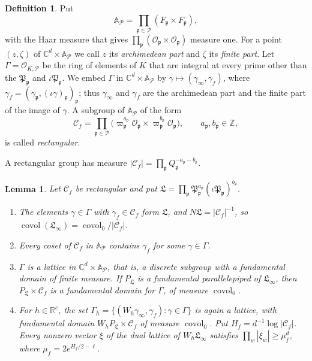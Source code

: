 \documentclass[11pt]{amsart}
\numberwithin{equation}{section}
\newtheorem{lemma}[equation]{Lemma}
\theoremstyle{definition}
\newtheorem{definition}[equation]{Definition}
\theoremstyle{remark}
\DeclareMathOperator{\covol}{covol}
\newcommand{\R}{\mathbb R}
\newcommand{\C}{\mathbb C}
\newcommand{\Z}{\mathbb Z}
\begin{document}
\begin{definition}\label{fw:finite-coordinates}
Put
\[
 \mathbb A_{\mathcal P}=\prod_{\mathfrak p\in\mathcal P}
 (F_{\mathfrak p}\times F_{\mathfrak p}),
\]
with the Haar measure that gives $\prod_{\mathfrak p}(\mathcal
O_{\mathfrak p}\times\mathcal O_{\mathfrak p})$ measure one. For a point
$(z,\zeta)$ of $\C^d\times\mathbb A_{\mathcal P}$ we call $z$ its
\emph{archimedean part} and $\zeta$ its \emph{finite part}. Let
$\Gamma=\mathcal O_{K,\mathcal P}$ be the ring of elements of $K$ that
are integral at every prime other than the $\mathfrak P_{\mathfrak p}$
and $\iota\mathfrak P_{\mathfrak p}$. We embed $\Gamma$ in
$\C^d\times\mathbb A_{\mathcal P}$ by
$\gamma\mapsto(\gamma_\infty,\gamma_f)$, where
$\gamma_f=(\gamma_{\mathfrak p},(\iota\gamma)_{\mathfrak p})_{\mathfrak
p}$; thus $\gamma_\infty$ and $\gamma_f$ are the archimedean part and the
finite part of the image of $\gamma$. A subgroup of $\mathbb A_{\mathcal
P}$ of the form
\[
 \mathcal C_f=\prod_{\mathfrak p\in\mathcal P}\bigl(\varpi_{\mathfrak
 p}^{a_{\mathfrak p}}\mathcal O_{\mathfrak p}\times\varpi_{\mathfrak
 p}^{b_{\mathfrak p}}\mathcal O_{\mathfrak p}\bigr),\qquad
 a_{\mathfrak p},b_{\mathfrak p}\in\Z,
\]
is called \emph{rectangular}.
\end{definition}

A rectangular group has measure
$|\mathcal C_f|=\prod_{\mathfrak p}Q_{\mathfrak p}^{-a_{\mathfrak
p}-b_{\mathfrak p}}$.

\begin{lemma}\label{fw:lattice}
Let $\mathcal C_f$ be rectangular and put
$\mathfrak L=\prod_{\mathfrak p}\mathfrak P_{\mathfrak p}^{a_{\mathfrak
p}}(\iota\mathfrak P_{\mathfrak p})^{b_{\mathfrak p}}$.
\begin{enumerate}
\item[(a)] The elements $\gamma\in\Gamma$ with $\gamma_f\in\mathcal C_f$
form $\mathfrak L$, and $N\mathfrak L=|\mathcal C_f|^{-1}$, so
$\covol(\mathfrak L_\infty)=\covol_0/|\mathcal C_f|$.
\item[(b)] Every coset of $\mathcal C_f$ in $\mathbb A_{\mathcal P}$
contains $\gamma_f$ for some $\gamma\in\Gamma$.
\item[(c)] $\Gamma$ is a lattice in $\C^d\times\mathbb A_{\mathcal P}$,
that is, a discrete subgroup with a fundamental domain of finite
measure. If $P_{\mathfrak L}$ is a fundamental parallelepiped of
$\mathfrak L_\infty$, then $P_{\mathfrak L}\times\mathcal C_f$ is a
fundamental domain for $\Gamma$, of measure $\covol_0$.
\item[(d)] For $h\in\R^c$, the set
$\Gamma_h=\{(W_h\gamma_\infty,\gamma_f):\gamma\in\Gamma\}$ is again a
lattice, with fundamental domain $W_hP_{\mathfrak L}\times\mathcal C_f$
of measure $\covol_0$. Put $H_f=d^{-1}\log|\mathcal C_f|$. Every nonzero
vector $\xi$ of the dual lattice of $W_h\mathfrak L_\infty$ satisfies
$\prod_w|\xi_w|\ge\mu_f^d$, where $\mu_f=2e^{H_f/2-\ell}$.
\end{enumerate}
\end{lemma}
\end{document}
